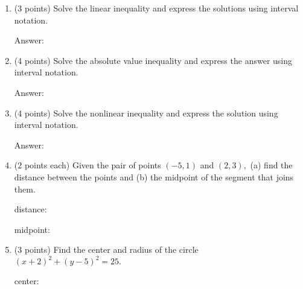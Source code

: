 \documentclass[11pt]{article}
\begin{document}
\begin{enumerate}
\item (3 points) Solve the linear inequality \scalebox{1.2}{$-9 \leq 4-5x <4$} and express the solutions using interval notation.

\begin{flushright}{Answer: \underline{\hspace{2in}}}\end{flushright}

\vspace{1in}
 \item (4 points) Solve the absolute value inequality  and express the answer using interval notation.

\begin{flushright}{Answer: \underline{\hspace{2in}}}\end{flushright}
\vspace{1in}
\item (4 points) Solve the nonlinear inequality \scalebox{1.2}{$(2-x)(x-4) < 0$} and express the solution using interval notation.

\begin{flushright}{Answer: \underline{\hspace{2in}}}\end{flushright}
\vfill
\item (2 points each) Given the pair of points $(-5,1)$ and $(2,3),$ (a) find the distance between the points and (b) the midpoint of the segment that joins them.

\begin{flushright}{distance: \underline{\hspace{2in}}}\end{flushright}

\begin{flushright}{midpoint: \underline{\hspace{2in}}}\end{flushright}

\vspace{0.25in}
\newpage
\item (3 points) Find the center and radius of the circle $(x+2)^2+(y-5)^2=25.$

\begin{flushright}{center: \underline{\hspace{2in}}}\end{flushright}


\end{enumerate}
\end{document}
